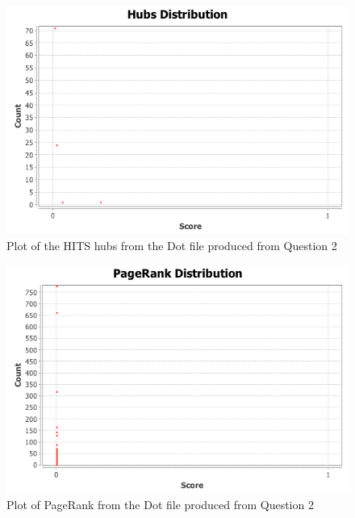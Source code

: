 \documentclass[letterpaper,11pt]{article}
\begin{document}
\begin{figure}[p]
\includegraphics[scale=0.5]{q3/HITS/hubs.png}
\caption{Plot of the HITS hubs from the Dot file produced from Question 2}
\label{fig:q3hits-hubs}
\end{figure}

\begin{figure}[p]
\includegraphics[scale=0.5]{q3/PageRank/pageranks.png}
\caption{Plot of PageRank from the Dot file produced from Question 2}
\label{fig:q3pagerank}
\end{figure}
\end{document}
